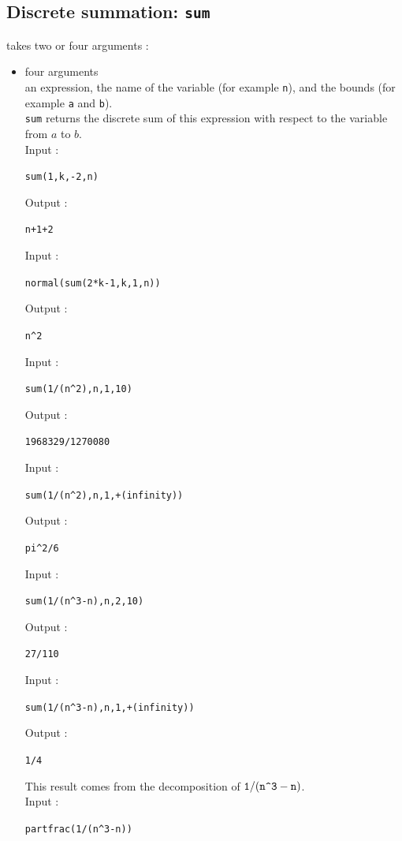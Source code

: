 \documentclass[a4paper,11pt]{book}
\begin{document}
\subsection{Discrete summation: {\tt sum}}
 takes two or four arguments :
\begin{itemize}
\item four arguments\\
an expression, the name of the variable (for 
example {\tt n}), and the bounds (for example {\tt a} and {\tt b}).\\
{\tt sum} returns the discrete sum of this expression with respect to
the variable from $a$ to $b$.\\
Input :
\begin{center}{\tt sum(1,k,-2,n) }\end{center}
Output  :
\begin{center}{\tt n+1+2}\end{center}
Input :
\begin{center}{\tt normal(sum(2*k-1,k,1,n))}\end{center}
Output  :
\begin{center}{\tt n\verb|^|2}\end{center}
Input :
\begin{center}{\tt sum(1/(n\verb|^|2),n,1,10)}\end{center}
Output  :
\begin{center}{\tt 1968329/1270080}\end{center} 
Input :
\begin{center}{\tt sum(1/(n\verb|^|2),n,1,+(infinity)) }\end{center}
Output  :
\begin{center}{\tt pi\verb|^|2/6}\end{center}
Input :
\begin{center}{\tt sum(1/(n\verb|^|3-n),n,2,10) }\end{center}
Output  :
\begin{center}{\tt 27/110}\end{center} 
Input :
\begin{center}{\tt sum(1/(n\verb|^|3-n),n,1,+(infinity)) }\end{center}
Output  :
\begin{center}{\tt 1/4}\end{center}
This result comes from the decomposition of ${\tt 1/(n\verb|^|3-n)}$.\\
Input :
\begin{center}{\tt partfrac(1/(n\verb|^|3-n)) }\end{center}

\end{itemize}
\end{document}
